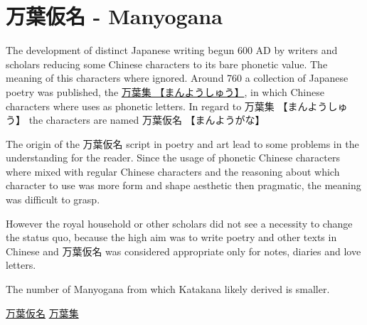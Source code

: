 \section{万葉仮名 - Manyogana} \label{sec:Manyogana}

The development of distinct Japanese writing begun 600 AD by writers and
scholars reducing some Chinese characters to its bare phonetic value. The
meaning of this characters where ignored. Around 760 a collection of Japanese
poetry was published, the \Link
\href{http://en.wikipedia.org/wiki/Man%27y%C5%8Dsh%C5%AB}{万葉集
【まんようしゅう】}, in which Chinese characters where uses as phonetic
letters. In regard to {万葉集} {【まんようしゅう】} the characters are named
{万葉仮名} {【まんようがな】}

The origin of the {万葉仮名} script in poetry and art lead to some problems in
the understanding for the reader. Since the usage of phonetic Chinese
characters where mixed with regular Chinese characters and the reasoning about
which character to use was more form and shape aesthetic then pragmatic, the
meaning was difficult to grasp.

However the royal household or other scholars did not see a necessity to change
the status quo, because the high aim was to write poetry and other texts in
Chinese and {万葉仮名} was considered appropriate only for notes, diaries and
love letters.


The number of Manyogana from which Katakana likely derived is smaller.  



\Link \href{http://en.wikipedia.org/wiki/Manyogana}{万葉仮名}
\Link \href{http://en.wikipedia.org/wiki/Man%27y%C5%8Dsh%C5%AB}{万葉集}

